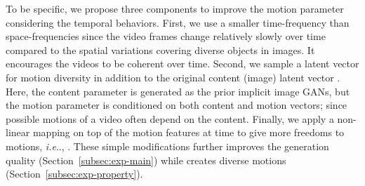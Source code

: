 \documentclass{article} \usepackage{iclr2022_conference,times}
\makeatletter
\DeclareRobustCommand\onedot{\futurelet\@let@token\@onedot}
\def\@onedot{\ifx\@let@token.\else.\null\fi\xspace}
\def\ie{\emph{i.e}\onedot} \def\Ie{\emph{I.e}\onedot}
\makeatother
\begin{document}
To be specific, we propose three components to improve the motion parameter  considering the temporal behaviors. First, we use a smaller time-frequency  than space-frequencies  since the video frames change relatively slowly over time compared to the spatial variations covering diverse objects in images. It encourages the videos to be coherent over time. Second, we sample a latent vector for motion diversity  in addition to the original content (image) latent vector . Here, the content parameter  is generated as the prior implicit image GANs, but the motion parameter  is conditioned on both content and motion vectors; since possible motions of a video often depend on the content. Finally, we apply a non-linear mapping  on top of the motion features at time  to give more freedoms to motions, \ie, . These simple modifications further improves the generation quality (Section~\ref{subsec:exp-main}) while creates diverse motions (Section~\ref{subsec:exp-property}).
\end{document}
